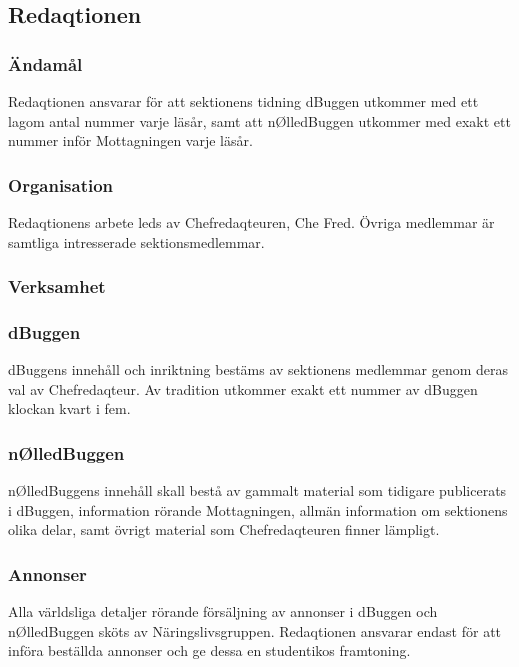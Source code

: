 \documentclass[a4paper,12pt]{article}
\begin{document}
\subsection{Redaqtionen}

\subsubsection{Ändamål}

Redaqtionen ansvarar för att sektionens tidning dBuggen utkommer med ett lagom antal nummer varje läsår, samt att nØlledBuggen utkommer med exakt ett nummer inför Mottagningen varje läsår.

\subsubsection{Organisation}

Redaqtionens arbete leds av Chefredaqteuren, Che Fred. Övriga medlemmar är samtliga intresserade sektionsmedlemmar.

\subsubsection{Verksamhet}

\subsubsection{dBuggen}

dBuggens innehåll och inriktning bestäms av sektionens medlemmar genom deras val av Chefredaqteur. Av tradition utkommer exakt ett nummer av dBuggen klockan kvart i fem.

\subsubsection{nØlledBuggen}

nØlledBuggens innehåll skall bestå av gammalt material som tidigare publicerats i dBuggen, information rörande Mottagningen, allmän information om sektionens olika delar, samt övrigt material som Chefredaqteuren finner lämpligt.

\subsubsection{Annonser}

Alla världsliga detaljer rörande försäljning av annonser i dBuggen och nØlledBuggen sköts av Näringslivsgruppen. Redaqtionen ansvarar endast för att införa beställda annonser och ge dessa en studentikos framtoning.
\end{document}
